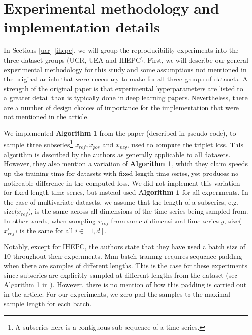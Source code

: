 \section{Experimental methodology and implementation details}
\label{expmet}
In Sections \ref{ucr}-\ref{ihepc}, we will group the reproducibility experiments into the three dataset groups (UCR, UEA and IHEPC). First, we will describe our general experimental methodology for this study and some assumptions not mentioned in the original article that were necessary to make for all three groups of datasets. A strength of the original paper is that experimental hyperparameters are listed to a greater detail than is typically done in deep learning papers. Nevertheless, there are a number of design choices of importance for the implementation that were not mentioned in the article. 

We implemented \textbf{Algorithm 1} from the paper (described in pseudo-code), to sample three subseries\footnote{A subseries here is a contiguous sub-sequence of a time series.} $x_{ref}, x_{pos}$ and $x_{neg}$, used to compute the triplet loss. This algorithm is described by the authors as generally applicable to all datasets. However, they also mention a variation of \textbf{Algorithm 1}, which they claim speeds up the training time for datasets with fixed length time series, yet produces no noticeable difference in the computed loss. We did not implement this variation for fixed length time series, but instead used \textbf{Algorithm 1} for all experiments. In the case of multivariate datasets, we assume that the length of a subseries, e.g. size($x_{ref}$), is the same across all dimensions of the time series being sampled from. In other words, when sampling $x_{ref}$ from some $d$-dimensional time series $y$, size($x^{i}_{ref}$) is the same for all $i\in[1,d]$.

Notably, except for IHEPC, the authors state that they have used a batch size of 10 throughout their experiments. Mini-batch training requires sequence padding when there are samples of different lengths. This is the case for these experiments since subseries are explicitly sampled at different lengths from the dataset (see Algorithm 1 in \cite{FranceschiUnsupervised2019}). However, there is no mention of how this padding is carried out in the article. For our experiments, we zero-pad the samples to the maximal sample length for each batch.





